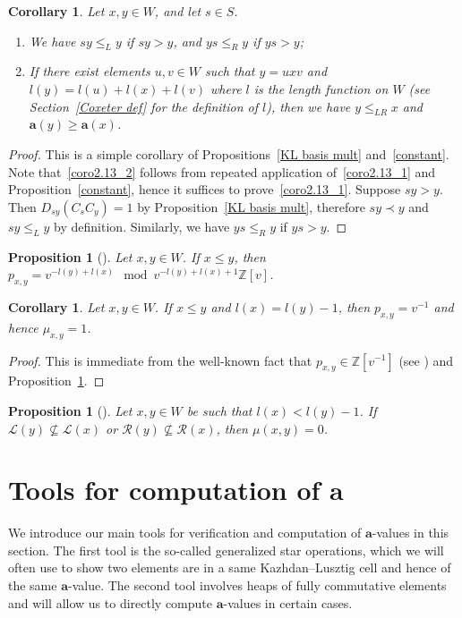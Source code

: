 \documentclass[10pt]{article}
\newtheorem{prop}[theorem]{Proposition}
\newtheorem{coro}[theorem]{Corollary}
\theoremstyle{definition}
\newcommand{\Z}{\mathbb{Z}}
\newcommand{\la}{\mathbf{a}}
\newcommand{\se}{\subseteq}
\newcommand{\inverse}{^{-1}}
\begin{document}
\begin{coro} \label{weak order} Let $x,y\in W$, and let $s\in
S$. 
\begin{enumerate} 
\item\label{coro2.13_1} We have $sy\le_L y$ if $sy>y$, and $ys\le_R y$ if $ys>y$;
\item\label{coro2.13_2} If there exist elements $u,v\in W$ such that $y=uxv$ and
 $l(y)=l(u)+l(x)+l(v)$ where $l$ is the length function on
 $W$ \textup{(}see Section~\ref{Coxeter def} for the definition of
 $l$\textup{)}, then
 we have $y\le_{LR}x$ and $\la(y)\ge \la(x)$. 
 \end{enumerate} 
 \end{coro}
 \begin{proof} 
 This is a simple corollary of Propositions~\ref{KL basis
 mult} and~\ref{constant}. Note that~\eqref{coro2.13_2} follows from repeated application of~\eqref{coro2.13_1} and
 Proposition~\ref{constant}, hence it suffices to prove~\eqref{coro2.13_1}. Suppose
 $sy>y$. Then $D_{sy}(C_sC_y)=1$ by Proposition~\ref{KL basis mult},
 therefore $sy\prec y$ and $sy\le_L y$ by definition. Similarly,
 we have $ys\le_R y$ if $ys>y$. \end{proof}


 \begin{prop}[{\cite[Proposition~5.4]{LG}}]
 \label{degree bound}
 Let $x,y\in W$. If $x\le y$, then $p_{x,y}=v^{-l(y)+l(x)}\mod
 v^{-l(y)+l(x)+1}\Z[v]$.
 \end{prop}

 \begin{coro}
 \label{difference 1}
 Let $x,y\in W$. If $x\le y$ and $l(x)=l(y)-1$, then $p_{x,y}=v\inverse$
 and hence $\mu_{x,y}=1$.
 \end{coro}
 \begin{proof}
 This is immediate from the
 well-known fact that $p_{x,y}\in \Z[v\inverse]$ (see \cite[Section~5.3]{LG}) and Proposition~\ref{degree bound}.
 \end{proof}

 \begin{prop}[{\cite[Fact 5]{Warrington}}]
 \label{extremal}
 Let $x,y\in W$ be such that $l(x)<l(y)-1$. If $\mathcal{L}(y)\not\se
 \mathcal{L}(x)$ or $\mathcal{R}(y)\not\se\mathcal{R}(x)$, then $\mu(x,y)=0$.
 \end{prop}


 \section{Tools for computation of \texorpdfstring{$\mathbf{a}$}{a}}
 \label{sec:tools}
 We introduce our main tools for verification and computation of
 $\la$-values in this section. The first tool is the so-called
 generalized star operations, which we will often use to show two elements
 are in a same Kazhdan--Lusztig cell and hence of the same $\la$-value.
 The second tool involves heaps of fully commutative elements and will
 allow us to directly compute $\la$-values in certain cases.
 
\end{document}
